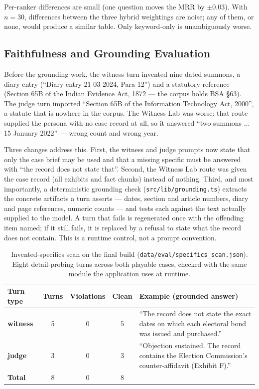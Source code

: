 \documentclass[12pt]{article}
\begin{document}
Per-ranker differences are small (one question moves the MRR by $\pm0.03$). With $n=30$, differences between the three hybrid weightings are noise; any of them, or none, would produce a similar table. Only keyword-only is unambiguously worse.

\subsection{Faithfulness and Grounding Evaluation}
Before the grounding work, the witness turn invented nine dated summons, a diary entry (``Diary entry 21-03-2024, Para 12'') and a statutory reference (Section 65B of the Indian Evidence Act, 1872 --- the corpus holds BSA \S63). The judge turn imported ``Section 65B of the Information Technology Act, 2000'', a statute that is nowhere in the corpus. The Witness Lab was worse: that route supplied the persona with no case record at all, so it answered ``two summons ... 15 January 2022'' --- wrong count and wrong year.

Three changes address this. First, the witness and judge prompts now state that only the case brief may be used and that a missing specific must be answered with ``the record does not state that''. Second, the Witness Lab route was given the case record (all exhibits and fact chunks) instead of nothing. Third, and most importantly, a deterministic grounding check (\texttt{src/lib/grounding.ts}) extracts the concrete artifacts a turn asserts --- dates, section and article numbers, diary and page references, numeric counts --- and tests each against the text actually supplied to the model. A turn that fails is regenerated once with the offending item named; if it still fails, it is replaced by a refusal to state what the record does not contain. This is a runtime control, not a prompt convention.

\begin{table}[!htbp]
\centering
\caption{Invented-specifics scan on the final build (\texttt{data/eval/specifics\_scan.json}). Eight detail-probing turns across both playable cases, checked with the same module the application uses at runtime.}
\label{tab:specifics}
\begin{tabularx}{0.86\textwidth}{>{\bfseries}p{}cccX}
\toprule
Turn type & Turns & Violations & Clean & Example (grounded answer) \\
\midrule
witness & 5 & 0 & 5 & ``The record does not state the exact dates on which each electoral bond was issued and purchased.'' \\
judge & 3 & 0 & 3 & ``Objection sustained. The record contains the Election Commission's counter-affidavit (Exhibit F).'' \\
\midrule
Total & 8 & 0 & 8 & \\
\bottomrule
\end{tabularx}
\end{table}
\end{document}
